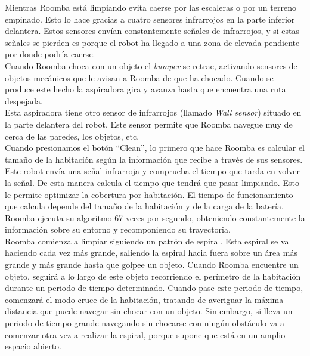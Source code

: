 Mientras Roomba está limpiando evita caerse por las escaleras o por un terreno empinado. Esto lo hace gracias a cuatro sensores infrarrojos en la parte inferior delantera. Estos sensores envían constantemente señales de infrarrojos, y si estas señales se pierden es porque el robot ha llegado a una zona de elevada pendiente por donde podría caerse.\\

Cuando Roomba choca con un objeto el \textit{bumper} se retrae, activando sensores de objetos mecánicos que le avisan a Roomba de que ha chocado. Cuando se produce este hecho la aspiradora gira y avanza hasta que encuentra una ruta despejada.\\

Esta aspiradora tiene otro sensor de infrarrojos (llamado \textit{Wall sensor}) situado en la parte delantera del robot. Este sensor permite que Roomba navegue muy de cerca de las paredes, los objetos, etc. \\

Cuando presionamos el botón ``Clean'', lo primero que hace Roomba es calcular el tamaño de la habitación según la información que recibe a través de sus sensores. Este robot envía una señal infrarroja y comprueba el tiempo que tarda en volver la señal. De esta manera calcula el tiempo que tendrá que pasar limpiando. Esto le permite optimizar la cobertura por habitación. El tiempo de funcionamiento que calcula depende del tamaño de la habitación y de la carga de la batería. \\

Roomba ejecuta su algoritmo 67 veces por segundo, obteniendo constantemente la información sobre su entorno y recomponiendo su trayectoria.\\

Roomba comienza a limpiar siguiendo un patrón de espiral. Esta espiral se va haciendo cada vez más grande, saliendo la espiral hacia fuera sobre un área más grande y más grande hasta que golpee un objeto. Cuando Roomba encuentre un objeto, seguirá a lo largo de este objeto recorriendo el perímetro de la habitación durante un periodo de tiempo determinado. Cuando pase este periodo de tiempo, comenzará el modo cruce de la habitación, tratando de averiguar la máxima distancia que puede navegar sin chocar con un objeto. Sin embargo, si lleva un periodo de tiempo grande navegando sin chocarse con ningún obstáculo va a comenzar otra vez a realizar la espiral, porque supone que está en un amplio espacio abierto.\\

